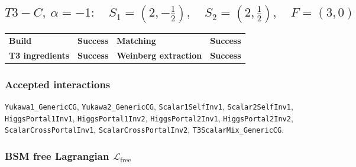\documentclass[10pt]{article}
\begin{document}
\subsection*{$T3-C,\ \alpha=-1:\quad S_1=(2,-\frac{1}{2}),\quad S_2=(2,\frac{1}{2}),\quad F=(3,0)$}
\begin{center}
\begin{tabular}{>{\bfseries}l l >{\bfseries}l l}
\toprule
Build & \textbf{Success} & Matching & \textbf{Success} \\
T3 ingredients & \textbf{Success} & Weinberg extraction & \textbf{Success} \\
\bottomrule
\end{tabular}
\end{center}
\subsubsection*{Accepted interactions}
\texttt{Yukawa1\_GenericCG}, \texttt{Yukawa2\_GenericCG}, \texttt{Scalar1SelfInv1}, \texttt{Scalar2SelfInv1}, \texttt{HiggsPortal1Inv1}, \texttt{HiggsPortal1Inv2}, \texttt{HiggsPortal2Inv1}, \texttt{HiggsPortal2Inv2}, \texttt{ScalarCrossPortalInv1}, \texttt{ScalarCrossPortalInv2}, \texttt{T3ScalarMix\_GenericCG}.
\subsubsection*{BSM free Lagrangian $\mathcal{L}_{\mathrm{free}}$}
\noindent{}\par
\smallskip
\noindent{}\par
\smallskip
\noindent{}\par
\smallskip
\noindent{}\par
\smallskip
\noindent{}\par
\smallskip
\noindent{}\par
\smallskip
\end{document}
